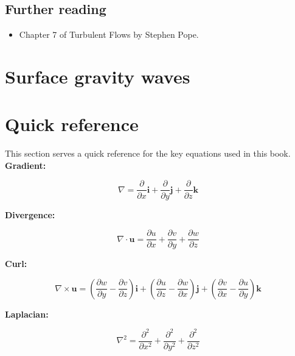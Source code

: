 \documentclass[12pt]{article}
\numberwithin{equation}{section}
\numberwithin{figure}{section}
\numberwithin{table}{section}
\begin{document}
\subsection*{Further reading}

\begin{itemize}
  \item Chapter 7 of Turbulent Flows by Stephen Pope.
\end{itemize}

\newpage
\section{Surface gravity waves}

\newpage
\appendix

\section{Quick reference}

This section serves a quick reference for the key equations used in this book.\\

\textbf{Gradient:}

\begin{equation}
  \nabla = \frac{\partial}{\partial x} \mathbf{i} + \frac{\partial}{\partial y} \mathbf{j} + \frac{\partial}{\partial z} \mathbf{k}
\end{equation}

\textbf{Divergence:}

\begin{equation}
  \nabla \cdot \mathbf{u} = \frac{\partial u}{\partial x} + \frac{\partial v}{\partial y} + \frac{\partial w}{\partial z}
\end{equation}

\textbf{Curl:}

\begin{equation}
  \nabla \times \mathbf{u} = \left( \frac{\partial w}{\partial y} - \frac{\partial v}{\partial z} \right) \mathbf{i} + \left( \frac{\partial u}{\partial z} - \frac{\partial w}{\partial x} \right) \mathbf{j} + \left( \frac{\partial v}{\partial x} - \frac{\partial u}{\partial y} \right) \mathbf{k}
\end{equation}

\textbf{Laplacian:}

\begin{equation}
  \nabla^2 = \frac{\partial^2}{\partial x^2} + \frac{\partial^2}{\partial y^2} + \frac{\partial^2}{\partial z^2}
\end{equation}
\end{document}
